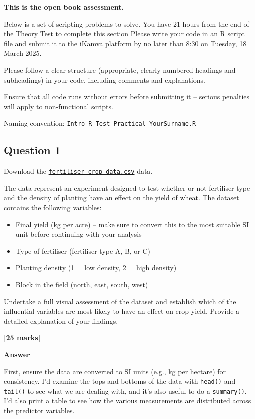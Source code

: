 \documentclass[
  10t,
]{article}
\providecommand{\tightlist}{%
  \setlength{\itemsep}{0pt}\setlength{\parskip}{0pt}}
\let\oldtexttt\texttt
\renewcommand{\texttt}[1]{\oldtexttt{\small #1}}
\begin{document}
{\textbf{This is the open book assessment.}}

Below is a set of scripting problems to solve. You have 21 hours from
the end of the Theory Test to complete this section Please write your
code in an R script file and submit it to the iKamva platform by no
later than 8:30 on Tuesday, 18 March 2025.

Please follow a clear structure (appropriate, clearly numbered headings
and subheadings) in your code, including comments and explanations.

{Ensure that all code runs without errors before submitting it --
serious penalties will apply to non-functional scripts.}

Naming convention: \texttt{Intro\_R\_Test\_Practical\_YourSurname.R}

\subsection{Question 1}\label{question-1-1}

Download the
\href{https://raw.githubusercontent.com/ajsmit/R_courses/main/static/data/fertiliser_crop_data.csv}{\texttt{fertiliser\_crop\_data.csv}}
data.

The data represent an experiment designed to test whether or not
fertiliser type and the density of planting have an effect on the yield
of wheat. The dataset contains the following variables:

\begin{itemize}
\tightlist
\item
  Final yield (kg per acre) -- make sure to convert this to the most
  suitable SI unit before continuing with your analysis
\item
  Type of fertiliser (fertiliser type A, B, or C)
\item
  Planting density (1 = low density, 2 = high density)
\item
  Block in the field (north, east, south, west)
\end{itemize}

Undertake a full visual assessment of the dataset and establish which of
the influential variables are most likely to have an effect on crop
yield. Provide a detailed explanation of your findings.

\textbf{{[}25 marks{]}}

\textbf{Answer}

First, ensure the data are converted to SI units (e.g., kg per hectare)
for consistency. I'd examine the tops and bottoms of the data with
\texttt{head()} and \texttt{tail()} to see what we are dealing with, and
it's also useful to do a \texttt{summary()}. I'd also print a table to
see how the various measurements are distributed across the predictor
variables.
\end{document}
